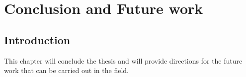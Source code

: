 \chapter{Conclusion and Future work}
\section{Introduction}
This chapter will conclude the thesis and will provide directions for the future work that can be carried out in the field.

